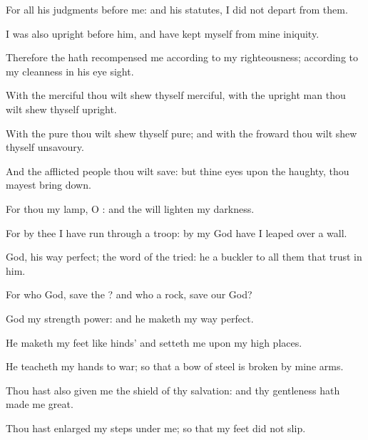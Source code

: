 {For all his
judgments
{} before me: and
{} his
statutes, I did not
depart from them.

I was also
upright before him, and have
kept myself from mine
iniquity.

Therefore the
{} hath
recompensed me according to my
righteousness; according to my
cleanness in his eye
sight.

With the
merciful thou wilt shew thyself
merciful,
{} with the
upright
man thou wilt shew thyself
upright.

With the
pure thou wilt shew thyself
pure; and with the
froward thou wilt shew thyself
unsavoury.

And the
afflicted
people thou wilt
save: but thine
eyes
{} upon the
haughty,
{} thou mayest bring
{}
down.

For thou
{} my
lamp, O
{}: and the
{} will
lighten my
darkness.

For by thee I have
run through a
troop: by my
God have I leaped
over a
wall.

God, his
way
{}
perfect; the
word of the
{}
{}
tried: he
{} a
buckler to all them that
trust in him.

For who
{}
God,
save the
{}? and who
{} a
rock,
save our
God?

God
{} my
strength
{}
power: and he
maketh my
way
perfect.

He
maketh my
feet
like
hinds’
{} and
setteth me upon my high
places.

He
teacheth my
hands to
war; so that a
bow of
steel is
broken by mine
arms.

Thou hast also
given me the
shield of thy
salvation: and thy
gentleness hath made me
great.

Thou hast
enlarged my
steps under me; so that my
feet did not
slip.

}
